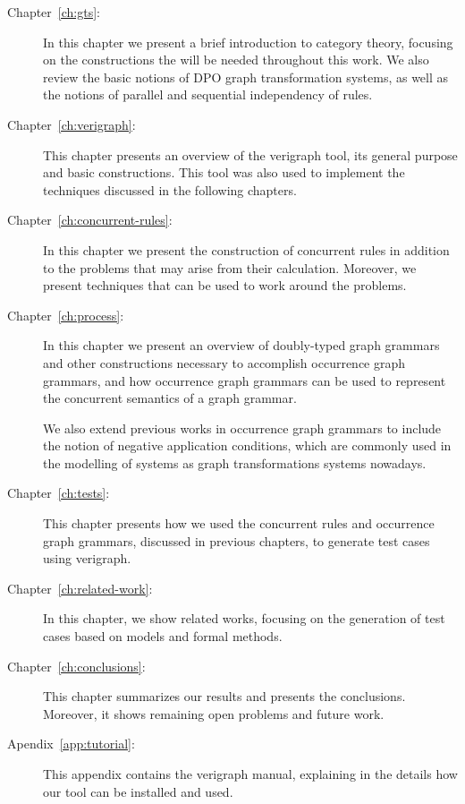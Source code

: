 \begin{description}
  \item[Chapter~\ref{ch:gts}:] In this chapter we present a brief introduction to category theory, focusing on the constructions the will be needed throughout this work.  We also review the basic notions of DPO graph transformation systems, as well as the notions of parallel and sequential independency of rules.
  \item[Chapter~\ref{ch:verigraph}:] This chapter presents an overview of the verigraph tool, its general purpose and basic constructions. This tool was also used to implement the techniques discussed in the following chapters.
  \item[Chapter~\ref{ch:concurrent-rules}:] In this chapter we present the construction of concurrent rules in addition to the problems that may arise from their calculation. Moreover, we present techniques that can be used to work around the problems.
  \item[Chapter~\ref{ch:process}:] In this chapter we present an overview of doubly-typed graph grammars and other constructions necessary to accomplish occurrence graph grammars, and how occurrence graph grammars can be used to represent the concurrent semantics of a graph grammar.

    We also extend previous works in occurrence graph grammars to include the notion of negative application conditions, which are commonly used in the modelling of systems as graph transformations systems nowadays.
  \item[Chapter~\ref{ch:tests}:] This chapter presents how we used the concurrent rules and occurrence graph grammars, discussed in previous chapters, to generate test cases using verigraph.
  \item[Chapter~\ref{ch:related-work}:] In this chapter, we show related works, focusing on the generation of test cases based on models and formal methods.
  \item[Chapter~\ref{ch:conclusions}:] This chapter summarizes our results and presents the conclusions. Moreover, it shows remaining open problems and future work.
  \item[Apendix~\ref{app:tutorial}:] This appendix contains the verigraph manual, explaining in the details how our tool can be installed and used.
\end{description}
